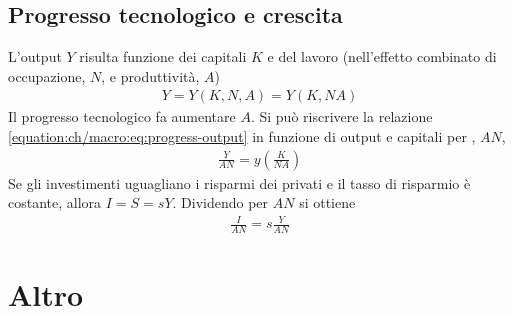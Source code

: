 \documentclass[letterpaper,10pt,italian]{jupyterBook}
\begin{document}
\subsection{Progresso tecnologico e crescita}
\label{\detokenize{ch/macro:progresso-tecnologico-e-crescita}}\label{\detokenize{ch/macro:economics-hs-macro-long-run-progress}}
\sphinxAtStartPar
L’output \(Y\) risulta funzione dei capitali \(K\) e del lavoro (nell’effetto combinato di occupazione, \(N\), e produttività, \(A\))
\begin{equation}\label{equation:ch/macro:eq:progress-output}
\begin{split}Y = Y(K,N,A) = Y(K, NA)\end{split}
\end{equation}
\sphinxAtStartPar
Il progresso tecnologico fa aumentare \(A\). Si può riscrivere la relazione \eqref{equation:ch/macro:eq:progress-output} in funzione di output e capitali per , \(AN\),
\begin{equation*}
\begin{split}\frac{Y}{AN} = y \left( \frac{K}{NA} \right)\end{split}
\end{equation*}
\sphinxAtStartPar
Se gli investimenti uguagliano i risparmi dei privati e il tasso di risparmio è costante, allora \(I = S = s Y\). Dividendo per \(AN\) si ottiene
\begin{equation*}
\begin{split}\frac{I}{AN} = s \frac{Y}{AN}\end{split}
\end{equation*}

\section{Altro}
\label{\detokenize{ch/macro:altro}}\label{\detokenize{ch/macro:economics-hs-macro-extra}}
\end{document}
